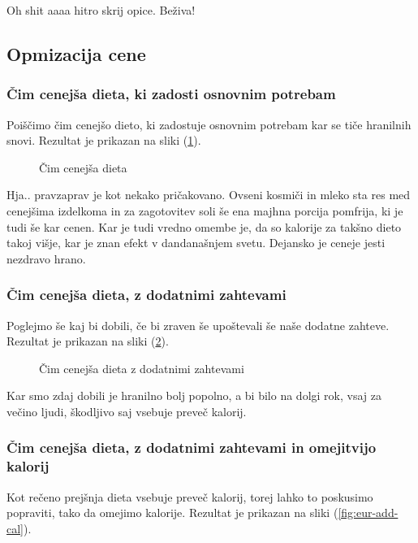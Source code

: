 \documentclass[a4paper]{article}
\begin{document}
Oh shit aaaa hitro skrij opice. Beživa!

\subsection{Opmizacija cene}
\subsubsection{Čim cenejša dieta, ki zadosti osnovnim potrebam}
Poiščimo čim cenejšo dieto, ki zadostuje osnovnim potrebam kar se tiče hranilnih 
snovi. Rezultat je prikazan na sliki (\ref{fig:eur}).

\begin{figure}[H]
    \centering
    \caption{Čim cenejša dieta}
    \label{fig:eur}
\end{figure}

Hja.. pravzaprav je kot nekako pričakovano. Ovseni kosmiči in mleko sta res med cenejšima 
izdelkoma in za zagotovitev soli še ena majhna porcija pomfrija, ki je tudi še kar cenen. Kar je
tudi vredno omembe je, da so kalorije za takšno dieto takoj višje, kar je znan efekt v dandanašnjem 
svetu. Dejansko je ceneje jesti nezdravo hrano.

\subsubsection{Čim cenejša dieta, z dodatnimi zahtevami}
Poglejmo še kaj bi dobili, če bi zraven še upoštevali še naše dodatne zahteve.
Rezultat je prikazan na sliki (\ref{fig:eur-add}).

\begin{figure}
    \centering
    \caption{Čim cenejša dieta z dodatnimi zahtevami}
    \label{fig:eur-add}
\end{figure}

Kar smo zdaj dobili je hranilno bolj popolno, a bi bilo na dolgi rok, vsaj za večino ljudi,
škodljivo saj vsebuje preveč kalorij.

\subsubsection{Čim cenejša dieta, z dodatnimi zahtevami in omejitvijo kalorij}
Kot rečeno prejšnja dieta vsebuje preveč kalorij, torej lahko to poskusimo popraviti, tako da 
omejimo kalorije. Rezultat je prikazan na sliki (\ref{fig:eur-add-cal}).
\end{document}
